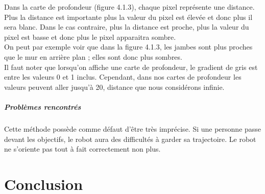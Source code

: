 \documentclass[12pt,a4paper]{report}
\begin{document}
Dans la carte de profondeur (figure 4.1.3), chaque pixel représente une distance. Plus la distance est importante plus la valeur du pixel est élevée et donc plus il sera blanc. Dans le cas contraire, plus la distance est proche, plus la valeur du pixel est basse et donc plus le pixel apparaitra sombre.\\
On peut par exemple voir que dans la figure 4.1.3, les jambes sont plus proches que le mur en arrière plan ; elles sont donc plus sombres.\\
Il faut noter que lorsqu'on affiche une carte de profondeur, le gradient de gris est entre les valeurs 0 et 1 inclus. Cependant, dans nos cartes de profondeur les valeurs peuvent aller jusqu'à 20, distance que nous considérons infinie.

\paragraph{Problèmes rencontrés}
Cette méthode possède comme défaut d'être très imprécise. Si une personne passe devant les objectifs, le robot aura des difficultés à garder sa trajectoire. Le robot ne s'oriente pas tout à fait correctement non plus.

\chapter{Conclusion}
\end{document}
